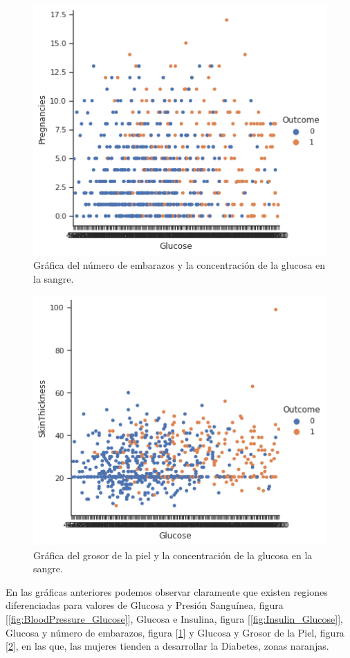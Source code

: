 \documentclass{article}
\begin{document}
\begin{figure}[H]
	\centering
	\includegraphics[width=0.65\linewidth]{Pregnancies_Glucose.png}
	\caption{Gráfica del número de embarazos y la concentración de la glucosa en la sangre.}%
	\label{fig:Pregnancies_Glucose}
\end{figure}

\begin{figure}[H]
	\centering
	\includegraphics[width=0.65\linewidth]{SkinThickness_Glucose.png}
	\caption{Gráfica del grosor de la piel y la concentración de la glucosa en la sangre.}%
	\label{fig:SkinThickness_Glucose}
\end{figure}

En las gráficas anteriores podemos observar claramente que existen regiones diferenciadas para valores de Glucosa y Presión Sanguínea, figura [\ref{fig:BloodPressure_Glucose}], Glucosa e Insulina, figura [\ref{fig:Insulin_Glucose}], Glucosa y número de embarazos, figura [\ref{fig:Pregnancies_Glucose}] y Glucosa y Grosor de la Piel, figura [\ref{fig:SkinThickness_Glucose}], en las que, las mujeres tienden a desarrollar la Diabetes, zonas naranjas.
\end{document}
